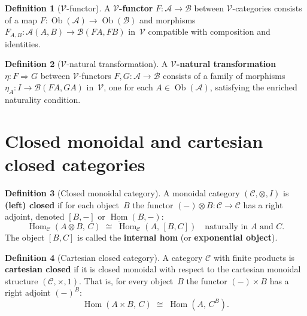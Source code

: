 \documentclass[a4paper,12pt]{book}
\DeclareMathOperator{\Hom}{Hom}
\DeclareMathOperator{\Ob}{Ob}
\theoremstyle{definition}
\newtheorem{definition}{Definition}[section]
\theoremstyle{plain}
\theoremstyle{remark}
\begin{document}
\begin{definition}[$\mathcal{V}$-functor]\label{def:enriched-functor}
A \textbf{$\mathcal{V}$-functor} $F\colon\mathcal{A}\to\mathcal{B}$
between $\mathcal{V}$-categories consists of a map
$F\colon\Ob(\mathcal{A})\to\Ob(\mathcal{B})$ and morphisms
$F_{A,B}\colon\mathcal{A}(A,B)\to\mathcal{B}(FA,FB)$ in~$\mathcal{V}$
compatible with composition and identities.
\end{definition}

\begin{definition}[$\mathcal{V}$-natural transformation]\label{def:enriched-nat}
A \textbf{$\mathcal{V}$-natural transformation}
$\eta\colon F\Rightarrow G$ between $\mathcal{V}$-functors
$F,G\colon\mathcal{A}\to\mathcal{B}$ consists of a family of morphisms
$\eta_A\colon I\to\mathcal{B}(FA,GA)$ in~$\mathcal{V}$, one for each
$A\in\Ob(\mathcal{A})$, satisfying the enriched naturality condition.
\end{definition}



\section{Closed monoidal and cartesian closed categories}%
\label{sec:closed-monoidal}


\begin{definition}[Closed monoidal category]\label{def:closed-monoidal}
A monoidal category $(\mathcal{C}, \otimes, I)$ is
\textbf{(left) closed} if for each object~$B$ the functor
$(-)\otimes B\colon\mathcal{C}\to\mathcal{C}$ has a right adjoint,
denoted $[B, -]$ or $\underline{\Hom}(B,-)$:
\[
    \Hom_\mathcal{C}(A\otimes B,\, C)
    \;\cong\;
    \Hom_\mathcal{C}(A,\, [B,C])
    \quad\text{naturally in } A \text{ and } C.
\]
The object $[B,C]$ is called the \textbf{internal hom}
(or \textbf{exponential object}).
\end{definition}

\begin{definition}[Cartesian closed category]\label{def:cartesian-closed}
A category $\mathcal{C}$ with finite products is \textbf{cartesian closed}
if it is closed monoidal with respect to the cartesian monoidal structure
$(\mathcal{C}, \times, 1)$.  That is, for every object~$B$ the functor
$(-)\times B$ has a right adjoint $(-)^B$:
\[
    \Hom(A\times B,\, C) \;\cong\; \Hom(A,\, C^B).
\]
\end{definition}
\end{document}
